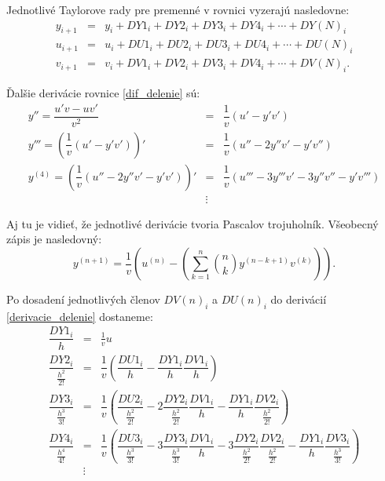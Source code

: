 Jednotlivé Taylorove rady pre premenné v rovnici vyzerajú nasledovne:
\begin{eqnarray}
y_{i + 1} & = & y_{i} + DY1_{i} + DY2_{i} + DY3_{i} + DY4_{i} + \cdots + DY(N)_{i}\\
u_{i+1} & = & u_i + DU1_i + DU2_i + DU3_i + DU4_i + \cdots + DU(N)_i\\
v_{i+1} & = & v_i + DV1_i + DV2_i + DV3_i + DV4_i + \cdots + DV(N)_i .
\end{eqnarray}



Ďalšie derivácie rovnice \eqref{dif_delenie} sú:
\begin{eqnarray}
y'' = \dfrac{u'v - uv'}{v^{2}} & = & \dfrac{1}{v} (u' - y'v') \label{derivacie_delenie} \\
y''' = \left( \dfrac{1}{v} (u' - y'v') \right)' & = & \dfrac{1}{v} (u'' - 2y''v' - y'v'') \nonumber \\
y^{(4)} = \left( \dfrac{1}{v} (u'' - 2y''v' - y'v') \right)' & = & \dfrac{1}{v} (u''' - 3y'''v' - 3y''v'' - y'v''') \nonumber \\
 & \vdots \nonumber &
\end{eqnarray}

Aj tu je vidieť, že jednotlivé derivácie tvoria Pascalov trojuholník. Všeobecný zápis je nasledovný:
\begin{equation}
y^{(n+1)} = \dfrac{1}{v} \left( u^{(n)} - \left( \sum_{k=1}^n \binom{n}{k} y^{(n-k+1)} v^{(k)} \right) \right) . \nonumber
\end{equation}
\bigskip

Po dosadení jednotlivých členov $ DV(n)_{i} $ a $ DU(n)_{i} $ do derivácií \eqref{derivacie_delenie} dostaneme:
\begin{eqnarray}
\dfrac{DY1_{i}}{h} & = & \frac{1}{v} u~\\
\dfrac{DY2_{i}}{\frac{h^{2}}{2!}} & = & \dfrac{1}{v} ( \dfrac{DU1_{i}}{h} - \dfrac{DY1_{i}}{h}\dfrac{DV1_{i}}{h} ) \nonumber \\
\dfrac{DY3_{i}}{\frac{h^{3}}{3!}} & = & \dfrac{1}{v} 
( \dfrac{DU2_{i}}{\frac{h^{2}}{2!}} - 
2\dfrac{DY2_{i}}{\frac{h^{2}}{2!}} \dfrac{DV1_{i}}{h} - 
\dfrac{DY1_{i}}{h} \dfrac{DV2_{i}}{\frac{h^{2}}{2!}} ) \nonumber \\
\dfrac{DY4_{i}}{\frac{h^{4}}{4!}} & = & \dfrac{1}{v} 
( \dfrac{DU3_{i}}{\frac{h^{3}}{3!}} - 
3\dfrac{DY3_{i}}{\frac{h^{3}}{3!}} \dfrac{DV1_{i}}{h} - 
3\dfrac{DY2_{i}}{\frac{h^{2}}{2!}} \dfrac{DV2_{i}}{\frac{h^{2}}{2!}} -
\dfrac{DY1_{i}}{h} \dfrac{DV3_{i}}{\frac{h^{3}}{3!}} ) \nonumber \\
& \vdots \nonumber & 
\end{eqnarray}


